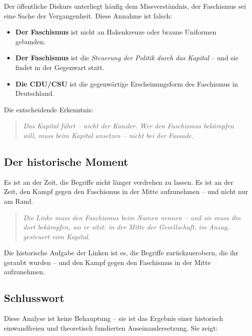 Der öffentliche Diskurs unterliegt häufig dem Missverständnis, der Faschismus sei eine Sache der Vergangenheit. Diese Annahme ist falsch:

\begin{itemize}
    \item \textbf{Der Faschismus} ist nicht an Hakenkreuze oder braune Uniformen gebunden.
    \item \textbf{Der Faschismus} ist die \emph{Steuerung der Politik durch das Kapital} -- und sie findet in der Gegenwart statt.
    \item \textbf{Die CDU/CSU} ist die gegenwärtige Erscheinungsform des Faschismus in Deutschland.
\end{itemize}

Die entscheidende Erkenntnis:

\begin{quote}
\emph{Das Kapital führt -- nicht der Kanzler. Wer den Faschismus bekämpfen will, muss beim Kapital ansetzen -- nicht bei der Fassade.}
\end{quote}

\subsection{Der historische Moment}

Es ist an der Zeit, die Begriffe nicht länger verdrehen zu lassen. Es ist an der Zeit, den Kampf gegen den Faschismus in der Mitte aufzunehmen -- und nicht nur am Rand.

\begin{quote}
\emph{Die Linke muss den Faschismus beim Namen nennen -- und sie muss ihn dort bekämpfen, wo er sitzt: in der Mitte der Gesellschaft, im Anzug, gesteuert vom Kapital.}
\end{quote}

Die historische Aufgabe der Linken ist es, die Begriffe zurückzuerobern, die ihr geraubt wurden -- und den Kampf gegen den Faschismus in der Mitte aufzunehmen.

\subsection{Schlusswort}

Diese Analyse ist keine Behauptung -- sie ist das Ergebnis einer historisch einwandfreien und theoretisch fundierten Auseinandersetzung. Sie zeigt:

